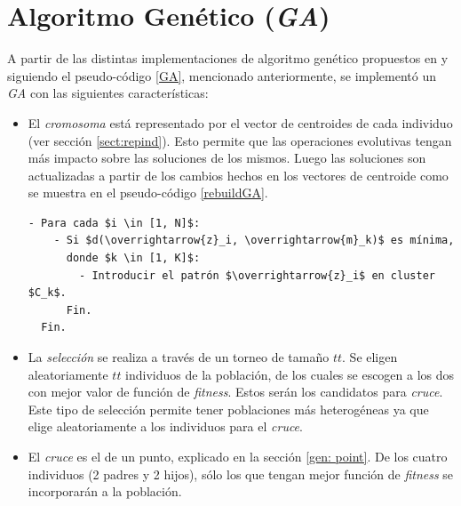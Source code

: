 \section{Algoritmo Genético (\emph{GA})}  \label{sect:igenetico}

    A partir de las distintas implementaciones de algoritmo genético propuestos
en \cite{HrCaFr2009} y siguiendo el pseudo-código \ref{GA}, mencionado
anteriormente, se implementó un \emph{GA} con las si\-guien\-tes características:
\begin{itemize}
    \item El \emph{cromosoma} está representado por el vector de centroides
de cada individuo (ver sección \ref{sect:repind}). Esto permite que las operaciones 
evolutivas tengan más impacto sobre las soluciones de los mismos. Luego las soluciones 
son actualizadas a partir de los cambios hechos en los vectores de centroide como se
muestra en el pseudo-código \ref{rebuildGA}.
\begin{lstlisting}[float=h!, caption={Actualización de Soluciones}, label=rebuildGA]
- Para cada $i \in [1, N]$:
    - Si $d(\overrightarrow{z}_i, \overrightarrow{m}_k)$ es mínima,
      donde $k \in [1, K]$:
        - Introducir el patrón $\overrightarrow{z}_i$ en cluster $C_k$.
      Fin.
  Fin.
\end{lstlisting}

    \item La \emph{selección} se realiza a través de un torneo de tamaño $tt$.
Se eligen aleatoriamente $tt$ individuos de la población, de los cuales se escogen
a los dos con mejor valor de función de \emph{fitness}. Estos serán los candidatos
para \emph{cruce}. Este tipo de selección permite tener poblaciones más heterogéneas
ya que elige aleatoriamente a los individuos para el \emph{cruce}.

    \item El \emph{cruce} es el de un punto, explicado en la sección \ref{gen: point}.
De los cuatro individuos (2 padres y 2 hijos), sólo los que tengan mejor función
de \emph{fitness} se incorporarán a la población.


\end{itemize}
